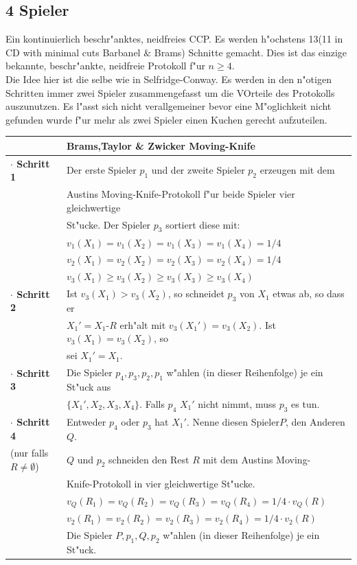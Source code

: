 \documentclass[11pt, a4paper, twoside]{article}
\numberwithin{equation}{section}
\begin{document}
\subsection{4 Spieler}
Ein kontinuierlich beschr"anktes, neidfreies CCP. Es werden h"ochstens 13(11 in CD with minimal cuts Barbanel $\&$ Brams) Schnitte gemacht. Dies ist das einzige bekannte, beschr"ankte, neidfreie Protokoll f"ur $n \geq 4$.\\
Die Idee hier ist die selbe wie in Selfridge-Conway. Es werden in den n"otigen Schritten immer zwei Spieler zusammengefasst um die VOrteile des Protokolls auszunutzen. Es l"asst sich nicht verallgemeiner bevor eine M"oglichkeit nicht gefunden wurde f"ur mehr als zwei Spieler einen Kuchen gerecht aufzuteilen.\\ 
\newline
\begin{tabular}{|ll|}
\hline
&\textbf{Brams,Taylor \& Zwicker Moving-Knife}\\
\hline
\textbf{$\cdot$ Schritt 1}&Der erste Spieler $p_1$ und der zweite Spieler $p_2$ erzeugen mit dem\\&Austins Moving-Knife-Protokoll f"ur beide Spieler vier gleichwertige\\&St"ucke. Der Spieler $p_3$ sortiert diese mit:\\
& $v_1(X_1)=v_1(X_2)=v_1(X_3)=v_1(X_4)=1/4$\\
& $v_2(X_1)=v_2(X_2)=v_2(X_3)=v_2(X_4)=1/4$\\
& $v_3(X_1)\geq  v_3(X_2)\geq v_3(X_3)\geq v_3(X_4)$\\
\textbf{$\cdot$ Schritt 2}& Ist $v_3(X_1)>v_3(X_2)$, so schneidet $p_3$ von $X_1$ etwas ab, so dass er\\&$X_1'=X_1$-$R$ erh"alt mit $v_3(X_1')=v_3(X_2)$. Ist $v_3(X_1)=v_3(X_2)$, so\\&sei  $X_1'=X_1$.\\
\textbf{$\cdot$ Schritt 3}&Die Spieler $p_4,p_3,p_2,p_1$ w"ahlen (in dieser Reihenfolge) je ein St"uck aus\\&$\{X_1',X_2,X_3,X_4\}$. Falls $p_4$ $X_1'$ nicht nimmt, muss $p_3$ es tun.\\
\textbf{$\cdot$ Schritt 4}& Entweder $p_4$ oder $p_3$ hat $X_1'$. Nenne diesen Spieler$P$, den Anderen $Q$.\\(nur falls $R \neq \emptyset$)&$Q$  und  $p_2$ schneiden den Rest $R$ mit dem Austins Moving-\\&Knife-Protokoll in vier gleichwertige St"ucke.\\
& $v_Q(R_1)=v_Q(R_2)=v_Q(R_3)=v_Q(R_4)=1/4 \cdot v_Q(R)$\\& $v_2(R_1)=v_2(R_2)=v_2(R_3)=v_2(R_4)=1/4 \cdot v_2(R)$\\&Die Spieler $P,p_1,Q,p_2$ w"ahlen (in dieser Reihenfolge) je ein St"uck.\\
\hline
\end{tabular}
\end{document}
